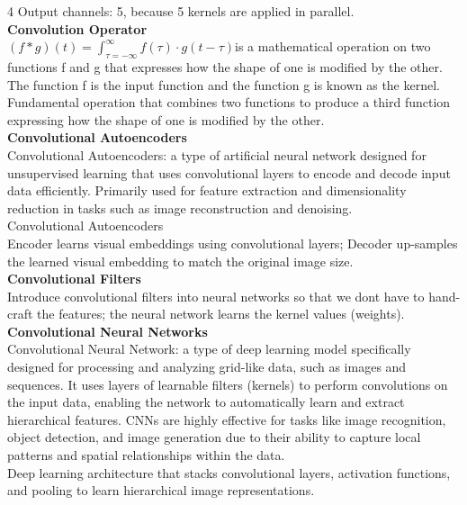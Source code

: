 \documentclass[8pt]{extarticle}
\begin{document}
\begin{multicols}{4}
Output channels: 5, because 5 kernels are applied in parallel.\\
\vspace{2pt}\textbf{Convolution Operator}\\
$(f \ast g)(t) = \int_{\tau = -\infty}^{\infty} f(\tau)\cdot g(t-\tau)$\Convolution is a mathematical operation on two functions f and g that expresses how the shape of one is modified by the other. The function f is the input function and the function g is known as the kernel.\\
Fundamental operation that combines two functions to produce a third function expressing how the shape of one is modified by the other.\\
\vspace{2pt}\textbf{Convolutional Autoencoders}\\
Convolutional Autoencoders: a type of artificial neural network designed for unsupervised learning that uses convolutional layers to encode and decode input data efficiently. Primarily used for feature extraction and dimensionality reduction in tasks such as image reconstruction and denoising.\\
Convolutional Autoencoders\\
Encoder learns visual embeddings using convolutional layers; Decoder up-samples the learned visual embedding to match the original image size.\\
\vspace{2pt}\textbf{Convolutional Filters}\\
Introduce convolutional filters into neural networks so that we don\textquotesingle t have to hand-craft the features; the neural network learns the kernel values (weights).\\
\vspace{2pt}\textbf{Convolutional Neural Networks}\\
Convolutional Neural Network: a type of deep learning model specifically designed for processing and analyzing grid-like data, such as images and sequences. It uses layers of learnable filters (kernels) to perform convolutions on the input data, enabling the network to automatically learn and extract hierarchical features. CNNs are highly effective for tasks like image recognition, object detection, and image generation due to their ability to capture local patterns and spatial relationships within the data.\\
Deep learning architecture that stacks convolutional layers, activation functions, and pooling to learn hierarchical image representations.\\

\end{multicols}
\end{document}
